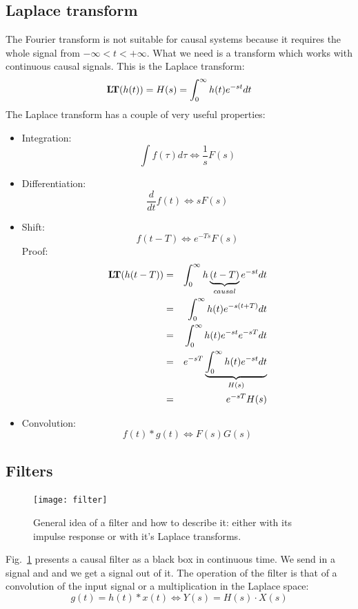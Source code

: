 \documentclass[12pt,a4paper]{article}
\def\lapl#1{{\mathrm{\bf L\!T}({#1})}}
\begin{document}
\subsection{Laplace transform}
The Fourier transform is not suitable for causal systems
because it requires the whole signal from $-\infty < t < +\infty$.
What we need is a transform which works with continuous causal signals.
This is the Laplace transform:
\begin{equation} 
\lapl{h(t)} = H(s) = \int_{0}^{\infty} h(t) e^{-st} dt
\label{lapltrans}
\end{equation}
The Laplace transform has a couple of very useful properties:
\begin{itemize}
\item Integration: 
\begin{equation}
\int f(\tau) d\tau \Leftrightarrow \frac{1}{s} F(s)
\end{equation}
\item Differentiation:
\begin{equation}
\frac{d}{dt} f(t) \Leftrightarrow s F(s) 
\end{equation}
\item Shift:
\begin{equation}
f(t - T) \Leftrightarrow e^{-Ts} F(s)
\label{shiftOperation}
\end{equation}
Proof:
\begin{eqnarray}
\lapl{h(t - T)} & = &\int_{0}^{\infty} h\underbrace{(t - T)}_{causal} e^{-st} dt \\
& = & \int_{0}^{\infty} h(t) e^{-s(t + T)} dt \\
& = & \int_{0}^{\infty} h(t) e^{-st} e^{-sT} dt \\
& = & e^{-sT} \underbrace{\int_{0}^{\infty} h(t) e^{-st} dt}_{H(s)} \\
& = & e^{-sT} H(s)
\end{eqnarray}

\item Convolution:
\begin{equation} 
f(t) * g(t) \Leftrightarrow F(s) G(s)
\end{equation}
\end{itemize}




\subsection{Filters}
\begin{figure}[!hbt]
\begin{center}
\mbox{\texttt{[image: filter]}}
\end{center}
\caption{General idea of a filter and how to describe it:
either with its impulse response or with it's Laplace transforms.
\label{filter}}
\end{figure}
Fig.~\ref{filter} presents a causal filter as a black box in continuous time. We
send in a signal and and we get a signal out of it. The
operation of the filter is that of a convolution of the input
signal or a multiplication in the Laplace space:
\begin{equation} 
g(t) = h(t) * x(t) \Leftrightarrow Y(s) = H(s) \cdot X(s)
\end{equation}
\end{document}
